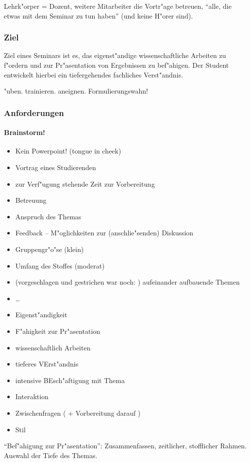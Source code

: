 \begin{kcmt}\begin{komacmt}
Lehrk"orper = Dozent, weitere Mitarbeiter die Vortr"age betreuen, "`alle, die etwas mit dem Seminar zu tun haben"' (und keine H"orer sind).
\end{komacmt}\end{kcmt}

\subsubsection{Ziel} 
	Ziel eines Seminars ist es, das eigenst"andige wissenschaftliche Arbeiten zu f"ordern
	und zur Pr"asentation von Ergebnissen zu bef"ahigen. Der Student entwickelt hierbei ein
	tiefergehendes fachliches Verst"andnis.

\begin{kcmt}\begin{komacmt}
"uben. trainieren. aneignen. Formulierungswahn!
\end{komacmt}\end{kcmt}


\subsubsection{Anforderungen}
\begin{kcmt}\begin{komacmt}
\paragraph{Brainstorm!} \begin{itemize}
	\item Kein Powerpoint! (tongue in cheek)
	\item Vortrag eines Studierenden 
	\item zur Verf"ugung stehende Zeit zur Vorbereitung
	\item Betreuung
	\item Anspruch des Themas
	\item Feedback -- M"oglichkeiten zur (anschlie"senden) Diskussion
	\item Gruppengr"o"se (klein)
	\item Umfang des Stoffes (moderat)
	\item (vorgeschlagen und gestrichen  war noch: ) aufeinander aufbauende Themen
	\item \dots
	\item Eigenst"andigkeit
	\item F"ahigkeit zur Pr"asentation
	\item wissenschaftlich Arbeiten
	\item tieferes VErst"andnis
	\item intensive BEsch"aftigung mit Thema
	\item Interaktion
	\item Zwischenfragen ( + Vorbereitung darauf )
	\item Stil
\end{itemize}
"`Bef"ahigung zur Pr"asentation"': Zusammenfassen, zeitlicher, stofflicher Rahmen.
Auswahl der Tiefe des Themas.
\end{komacmt}\end{kcmt}

